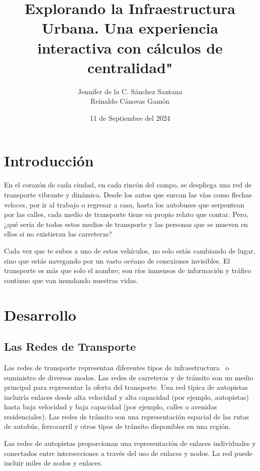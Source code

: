 \documentclass[12pt]{article}
\title{Explorando la Infraestructura Urbana. Una experiencia interactiva con cálculos de centralidad"}
\author{Jennifer de la C. Sánchez Santana\\ Reinaldo  Cánovas Gamón  }
\date{11 de Septiembre del 2024}
\begin{document}
\maketitle
\newpage

\tableofcontents
\newpage

\section{Introducción}

En el corazón de cada ciudad, en cada rincón del campo, se despliega una red de transporte vibrante y dinámica. Desde los autos que surcan las vías como flechas veloces, por ir al trabajo o regresar a casa, hasta los autobuses que serpentean por las calles, cada medio de transporte tiene su propio relato que contar. Pero, ¿qué sería de todos estos medios de transporte y las personas que se mueven en ellos si no existieran las carreteras?

Cada vez que te subes a uno de estos vehículos, no solo estás cambiando de lugar, sino que estás navegando por un vasto océano de conexiones invisibles. El transporte es más que solo el nombre; son ríos inmensos de información y tráfico continuo que van inundando nuestras vidas.

\section{Desarrollo}

\subsection{Las Redes de Transporte}

Las redes de transporte representan diferentes tipos de infraestructura \ o suministro de diversos modos. Las redes de carreteras y de tránsito son un medio principal para representar la oferta del transporte. Una red típica de autopistas incluiría enlaces desde alta velocidad y alta capacidad (por ejemplo, autopistas) hasta baja velocidad y baja capacidad (por ejemplo, calles o avenidas residenciales). Las redes de tránsito son una representación espacial de las rutas de autobús, ferrocarril y otros tipos de tránsito disponibles en una región.

Las redes de autopistas proporcionan una representación de enlaces individuales y conectados entre intersecciones a través del uso de enlaces y nodos. La red puede incluir miles de nodos y enlaces.
\end{document}

